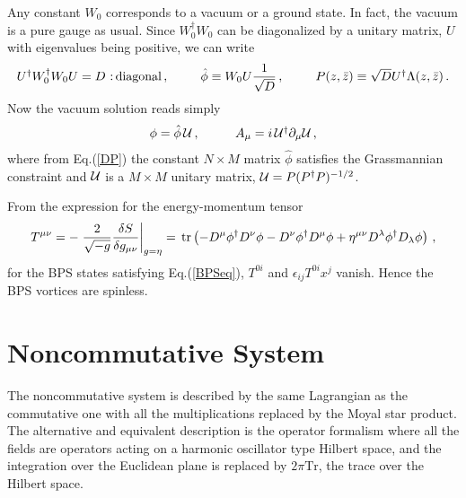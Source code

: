 \documentclass[a4paper,12pt]{article}
\def\tr{{\mbox{\,tr}}}
\def\Tr{{\mbox{Tr}}}
\begin{document}
Any constant $W_{0}$ corresponds to a vacuum or  a ground state. In fact, the vacuum is a pure gauge as usual.  Since $W^{\dagger}_{0}W_{0}$ can be
diagonalized by a unitary matrix, $U$ with eigenvalues being positive, we can write
\begin{equation}
\begin{array}{ccc}
U^{\dagger}W^{\dagger}_{0}W_{0}U=D~\mbox{:\,diagonal}\,,~~~&~~\hat{\phi}\equiv
W_{0}U\displaystyle{\frac{1}{\sqrt{D}}}\,,~~~&~~
P(z,\bar{z})\equiv\sqrt{D}U^{\dagger}\Lambda(z,\bar{z})\,.
\end{array}
\label{DP}
\end{equation}
Now the vacuum solution reads simply
\begin{equation}
\begin{array}{cc}
\phi=\hat{\phi}\,{\cal U}\,,~~~&~~~A_{\mu}=i\,{\cal U}^{\dagger}\partial_{\mu}{\cal U}\,,
\end{array}
\label{vac}
\end{equation}
where from Eq.(\ref{DP}) the constant $N\times M$ matrix $\hat{\phi}$ satisfies the Grassmannian constraint and ${\cal U}$ is a $M\times M$ unitary
matrix, ${\cal U}=P(P^{\dagger}P)^{-1/2}$. \newline

From the expression for the energy-momentum tensor
\begin{equation}
T^{\mu\nu}=-\left.{\frac{2}{\sqrt{-g}}}\frac{\delta S}{\delta
g_{\mu\nu}}\right|_{g=\eta}=\tr\left(-D^{\mu}\phi^{\dagger}D^{\nu}\phi-D^{\nu}\phi^{\dagger}D^{\mu}\phi
+\eta^{\mu\nu}D^{\lambda}\phi^{\dagger}D_{\lambda}\phi \right)\,,
\end{equation}
for the BPS states  satisfying Eq.(\ref{BPSeq}), $T^{0i}$ and $\epsilon_{ij}T^{0i}x^{j}$ vanish. Hence the BPS
vortices are spinless.





\section{Noncommutative System}
The noncommutative system is described by the same Lagrangian as the commutative one with  all the multiplications
replaced by the Moyal star product. The alternative and equivalent description is the operator formalism where all
the fields are operators acting on a harmonic oscillator type Hilbert space, and  the integration over the
Euclidean plane is replaced by $2\pi\Tr$,  the trace over the Hilbert space.\\
\end{document}
